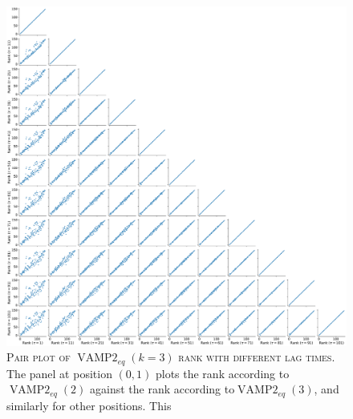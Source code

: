 \documentclass{article}
\begin{document}
\begin{figure}
    \centering
    \includegraphics[width=1.0\textwidth]{figures/vampeq_rank_vs_lag_pairplot_k5.pdf}
    \caption{\textsc{Pair plot of $\operatorname{VAMP2}_{eq}(k=3)$ rank with different lag times.} The panel at position $(0,1)$ plots the rank according to$\operatorname{VAMP2}_{eq}(2)$ against the  rank according to$\operatorname{VAMP2}_{eq}(3)$, and similarly for other positions. This }
    \label{fig:vampeq5_rank_vs_lag_pairplot}
\end{figure}
\end{document}
